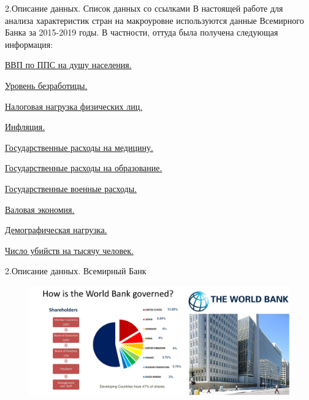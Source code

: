 \documentclass[aspectratio=169]{beamer}
\begin{document}
\begin{frame}{2.Описание данных. Список данных со ссылками}
В настоящей работе для анализа характеристик стран на макроуровне используются данные Всемирного Банка за 2015-2019 годы. В частности, оттуда была получена следующая информация:


      \item \href{https://data.worldbank.org/indicator/NY.GDP.PCAP.PP.CD}{ВВП по ППС на душу населения.}
        \item \href{https://data.worldbank.org/indicator/GB.XPD.RSDV.GD.ZS?view=chart}{Уровень безработицы.}
        \item \href{https://data.worldbank.org/indicator/IC.TAX.TOTL.CP.ZS?view=chart}{Налоговая нагрузка физических лиц.}
        \item \href{https://data.worldbank.org/indicator/FP.CPI.TOTL.ZG?view=chart}{Инфляция.}
        \item \href{https://data.worldbank.org/indicator/SH.XPD.CHEX.GD.ZS}{Государственные расходы на медицину.}
        \item \href{https://data.worldbank.org/indicator/SE.XPD.TOTL.GD.ZS?view=chart }{Государственные расходы на образование.}
        \item \href{https://data.worldbank.org/indicator/MS.MIL.XPND.GD.ZS}{Государственные военные расходы.}
        \item \href{https://data.worldbank.org/indicator/NY.GNS.ICTR.ZS?view=chart}{Валовая экономия.}
        \item \href{https://data.worldbank.org/indicator/SP.POP.DPND}{Демографическая нагрузка.}
        \item \href{https://data.worldbank.org/indicator/VC.IHR.PSRC.P5}{Число убийств на тысячу человек.}
        
\end{frame}



\begin{frame}{2.Описание данных. Всемирный Банк}
\begin{figure} \label{hompic}
            \centering
            \includegraphics[scale=0.4]{Union4.png}
    \end{figure}
\end{frame}
\end{document}

